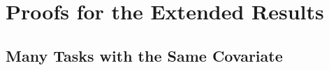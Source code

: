 \section{Proofs for the Extended Results}

\subsection{Many Tasks with the Same Covariate}\label{app_proof_many_tasks}







